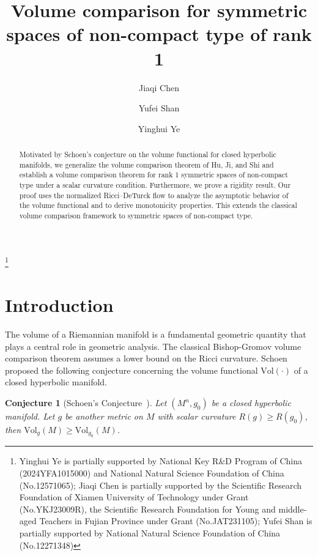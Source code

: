 \documentclass[12pt]{amsart}
\newtheorem{conjecture}{Conjecture}[section]
\begin{document}

\title{Volume comparison for symmetric spaces of non-compact type of rank 1}

\author{Jiaqi Chen}
\address{School of Electrical Engineering and Automation, Xiamen University of Technology, Xiamen 361024, Fujian, P.R. China.}

\author{Yufei Shan}
\address{School of Mathematical Sciences, Shanghai Jiao Tong University,  Shanghai 200240, P.R. China.}

\author{Yinghui Ye}
\address{Department of Mathematics, Sun Yat-sen University, Guangzhou, Guangdong 510275, P.R. China.}



\thanks{Yinghui Ye is partially supported by National Key R\&D Program of China (2024YFA1015000) and National Natural Science Foundation of China (No.12571065); Jiaqi Chen is partially supported by the Scientific Research Foundation of Xiamen University of Technology under Grant (No.YKJ23009R), the Scientific Research Foundation for Young and middle-aged Teachers in Fujian Province under Grant (No.JAT231105); Yufei Shan is partially supported by National Natural Science Foundation of China (No.12271348)}


\begin{abstract}
    Motivated by Schoen's conjecture on the volume functional for closed hyperbolic manifolds, we generalize the volume comparison theorem of Hu, Ji, and Shi and establish a volume comparison theorem for rank 1 symmetric spaces of non-compact type under a scalar curvature condition. Furthermore, we prove a rigidity result. Our proof uses the normalized Ricci--DeTurck flow to analyze the asymptotic behavior of the volume functional and to derive monotonicity properties. This extends the classical volume comparison framework to symmetric spaces of non-compact type.
\end{abstract}
\maketitle
\section{Introduction}

The volume of a Riemannian manifold is a fundamental geometric quantity that plays a central role in geometric analysis. The classical Bishop-Gromov volume comparison theorem assumes a lower bound on the Ricci curvature. Schoen proposed the following conjecture concerning the volume functional $\mathrm{Vol}(\cdot)$ of a closed hyperbolic manifold.
\begin{conjecture}[Schoen's Conjecture~\cite{Sc1989}]
    Let $(M^n, g_0)$ be a closed hyperbolic manifold. Let $g$ be another metric on $M$ with scalar curvature $R(g) \geq R(g_0)$, then $\mathrm{Vol}_g(M) \geq \mathrm{Vol}_{g_0} (M)$.
\end{conjecture} 
\end{document}

